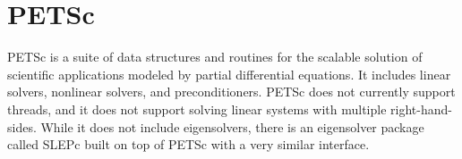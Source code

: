 \section{PETSc}
PETSc is a suite of data structures and routines for the scalable solution of
scientific applications modeled by partial differential equations.
It includes linear solvers, nonlinear solvers, and preconditioners.  PETSc does
not currently support threads, and it does not support solving linear systems
with multiple right-hand-sides.  While it does not include eigensolvers, there
is an eigensolver package called SLEPc built on top of PETSc with a very similar
interface.